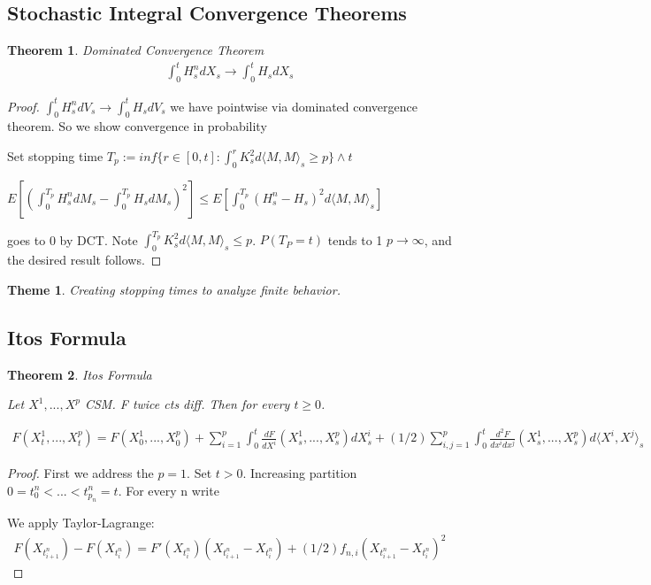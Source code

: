 \documentclass[11pt]{article}
\newtheorem{theme}{Theme}
\newtheorem{theorem}{Theorem}
\begin{document}
\subsection{Stochastic Integral Convergence Theorems}

\begin{theorem}
	Dominated Convergence Theorem
	\begin{align*}
		\int_0^t H_s^n d X_s \to \int_0^t H_s dX_s
	\end{align*}
\end{theorem}

\begin{proof}
	$\int_0^t H_s^n dV_s \to \int_0^t H_s dV_s$ we have pointwise via dominated convergence theorem. So we show convergence in probability

	Set stopping time $T_p := inf\{r \in [0,t] : \int_0^r K_s^2 d\langle M,M\rangle_s \geq p\} \wedge t$

	$E[(\int_0^{T_p}H_s^n dM_s - \int_0^{T_p}H_s dM_s)^2] \leq E[\int_0^{T_p} (H_s^n -H_s)^2 d \langle M,M\rangle_s]$

	goes to 0 by DCT. Note $\int_0^{T_p} K_s^2 d\langle M,M \rangle_s \leq p$. $P(T_P = t)$ tends to 1 $p \to \infty$, and the desired result follows. 
\end{proof}

\begin{theme}
	Creating stopping times to analyze finite behavior.
\end{theme}

\subsection{Itos Formula}

\begin{theorem}\textit{Itos Formula}

	Let $X^1,...,X^p$ CSM. F twice cts diff. Then for every $t \geq 0$. 

	\begin{align*}
		F(X_t^1,...,X_t^p) = F(X_0^1,...,X_0^p) + \sum_{i=1}^p \int_0^t \frac{dF}{dX^i} (X_s^1,...,X_s^p) dX_s^i + (1/2)\sum_{i,j=1}^p \int_0^t \frac{d^2 F}{dx^i dx^j} (X_s^1,...,X_s^p) d\langle X^i,X^j\rangle_s
	\end{align*}

\end{theorem}

\begin{proof}
	First we address the $p=1$. Set $t > 0$. Increasing partition $0 = t_0^n < ... < t_{p_n}^n =t$. For every n write

	We apply Taylor-Lagrange:
	\begin{align*}
		F(X_{t_{i+1}^n}) - F(X_{t_i^n}) = F'(X_{t_i^n})(X_{t_{i+1}^n} - X_{t_i^n}) + (1/2)f_{n,i}(X_{t_{i+1}^n} - X_{t_i^n})^2
	\end{align*}

\end{proof}
\end{document}
